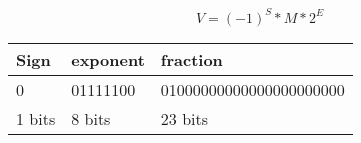 \documentclass[
  11pt, %
  xcolor=dvipsnames
]{beamer}
\begin{document}
\begin{frame}[fragile]


	\begin{columns}[c]
		\begin{column}{0.9\textwidth}

			\[
				V = (-1)^{S} * M * 2^E
			\]

			\begin{table}
				\begin{tabular}{l l l}
					\toprule
					Sign   & exponent & fraction                \\
					\midrule
					0      & 01111100 & 01000000000000000000000 \\
					1 bits & 8 bits   & 23 bits                 \\
					\bottomrule
				\end{tabular}
			\end{table}

		\end{column}
	\end{columns}

\end{frame}
\end{document}
